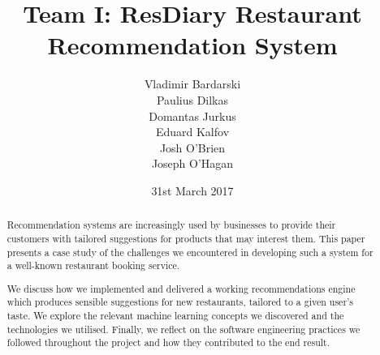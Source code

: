 \documentclass{l3proj}
\begin{document}
\title{Team I: ResDiary Restaurant Recommendation System}

\author{Vladimir Bardarski \\
        Paulius Dilkas \\
        Domantas Jurkus \\
        Eduard Kalfov \\
        Josh O'Brien \\
		Joseph O'Hagan}

\date{31st March 2017}

\maketitle

\begin{abstract}
Recommendation systems are increasingly used by businesses to provide their customers with tailored suggestions for products that may interest them. This paper presents a case study of the challenges we encountered in developing such a system for a well-known restaurant booking service. 

We discuss how we implemented and delivered a working recommendations engine which produces sensible suggestions for new restaurants, tailored to a given user's taste. We explore the relevant machine learning concepts we discovered and the technologies we utilised. Finally, we reflect on the software engineering practices we followed throughout the project and how they contributed to the end result.
\end{abstract}

\end{document}
